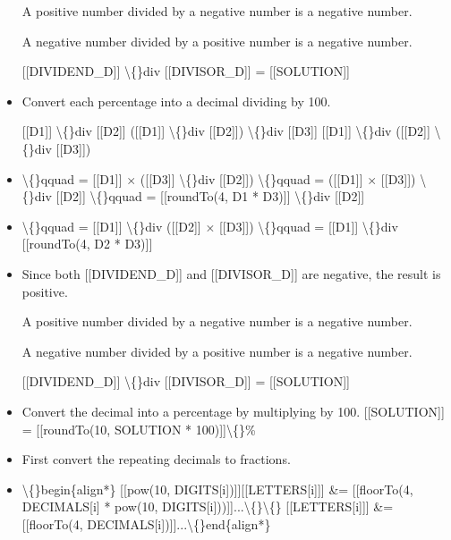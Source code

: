 \documentclass{article}
\begin{document}
\begin{itemize}
                        
                            A positive number divided by a negative number is a negative number.
                        
                        
                            A negative number divided by a positive number is a negative number.
                        
                        [[DIVIDEND\_D]] \textbackslash\{\}div [[DIVISOR\_D]] = [[SOLUTION]]
  \item Convert each percentage into a decimal dividing by 100.
                        
                            [[D1]] \textbackslash\{\}div [[D2]]
                            ([[D1]] \textbackslash\{\}div [[D2]]) \textbackslash\{\}div [[D3]]
                            [[D1]] \textbackslash\{\}div ([[D2]] \textbackslash\{\}div [[D3]])
  \item \textbackslash\{\}qquad = [[D1]] $\times$ ([[D3]] \textbackslash\{\}div [[D2]])
                        \textbackslash\{\}qquad = ([[D1]] $\times$ [[D3]]) \textbackslash\{\}div [[D2]]
                        \textbackslash\{\}qquad = [[roundTo(4, D1 * D3)]] \textbackslash\{\}div [[D2]]
  \item \textbackslash\{\}qquad = [[D1]] \textbackslash\{\}div ([[D2]] $\times$ [[D3]])
                        \textbackslash\{\}qquad = [[D1]] \textbackslash\{\}div [[roundTo(4, D2 * D3)]]
  \item Since both [[DIVIDEND\_D]] and [[DIVISOR\_D]] are negative, the result is positive.
                        
                        
                            A positive number divided by a negative number is a negative number.
                        
                        
                            A negative number divided by a positive number is a negative number.
                        
                        [[DIVIDEND\_D]] \textbackslash\{\}div [[DIVISOR\_D]] = [[SOLUTION]]
  \item Convert the decimal into a percentage by multiplying by 100.
                        [[SOLUTION]] = [[roundTo(10, SOLUTION * 100)]]\textbackslash\{\}\%
  \item First convert the repeating decimals to fractions.
  \item \textbackslash\{\}begin\{align*\}
                            [[pow(10, DIGITS[i])]][[LETTERS[i]]] \&= [[floorTo(4, DECIMALS[i] * pow(10, DIGITS[i]))]]...\textbackslash\{\}\textbackslash\{\}
                            [[LETTERS[i]]] \&= [[floorTo(4, DECIMALS[i])]]...\textbackslash\{\}end\{align*\}
                        

\end{itemize}
\end{document}
